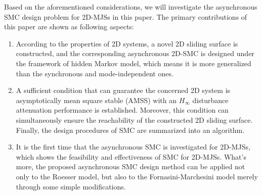 \documentclass[journal,final,twocolumn]{IEEEtran}
\begin{document}
	Based on the aforementioned considerations, we will investigate the asynchronous SMC design problem for 2D-MJSs in this paper. 
	The primary contributions of this paper are shown as following aspects:
	\begin{enumerate}
		\item  According to the properties of 2D systems, a novel 2D sliding surface is constructed, and the corresponding asynchronous 2D-SMC  is designed under the framework of hidden Markov model, which means it is more generalized than the synchronous and mode-independent ones.
		\item  A sufficient condition that can guarantee the concerned 2D system is asymptotically mean square stable (AMSS) with an  $H_{\infty}$ disturbance attenuation performance is established. Moreover, this condition can simultaneously ensure the reachability of the constructed 2D sliding surface. Finally, the  design procedures of SMC are summarized into an algorithm.
		\item  It is the first time that the asynchronous SMC is investigated for 2D-MJSs, which shows the feasibility and effectiveness of SMC for 2D-MJSs. What's more, the proposed asynchronous SMC design method can be applied not only to the Roesser model, but also to the  Fornasini-Marchesini  model  merely through some simple modifications.
	\end{enumerate}
\end{document}
